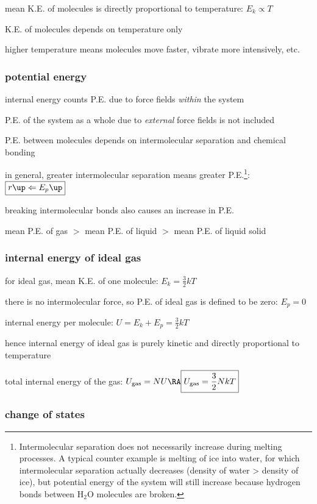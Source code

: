 \cmt mean K.E. of molecules is directly proportional to temperature: $\boxed{E_k \propto T}$

K.E. of molecules depends on temperature only

higher temperature means molecules move faster, vibrate more intensively, etc.





\subsubsection{potential energy}

\cmt internal energy counts P.E. due to force fields \emph{within} the system

P.E. of the system as a whole due to \emph{external} force fields is not included

\cmt P.E. between molecules depends on intermolecular separation and chemical bonding

in general, greater intermolecular separation means greater P.E.\footnote{Intermolecular separation does not necessarily increase during melting processes. A typical counter example is melting of ice into water, for which intermolecular separation actually decreases (density of water > density of ice), but potential energy of the system will still increase because hydrogen bonds between H$_2$O molecules are broken.}: $\boxed{r \up \Leftarrow E_p \up}$

breaking intermolecular bonds also causes an increase in P.E.

mean P.E. of gas $>$ mean P.E. of liquid $>$ mean P.E. of liquid solid

\subsubsection{internal energy of ideal gas}

for ideal gas, mean K.E. of one molecule: $E_k = \frac{3}{2}kT$

there is no intermolecular force, so P.E. of ideal gas is defined to be zero: $E_p = 0$

internal energy per molecule: $U = E_k + E_p = \frac{3}{2}kT$

hence internal energy of ideal gas is purely kinetic and directly proportional to temperature

total internal energy of the gas: $U_\text{gas} = NU \RA \boxed{U_\text{gas} = \frac{3}{2}NkT}$

\subsubsection{change of states}

